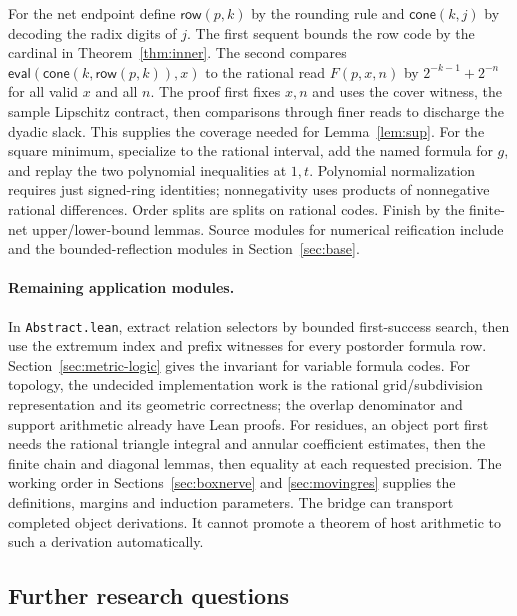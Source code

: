 For the net endpoint define $\mathsf{row}(p,k)$ by the rounding rule and $\mathsf{cone}(k,j)$ by decoding the radix digits of $j$. The first sequent bounds the row code by the cardinal in Theorem~\ref{thm:inner}. The second compares $\mathsf{eval}(\mathsf{cone}(k,\mathsf{row}(p,k)),x)$ to the rational read $F(p,x,n)$ by $2^{-k-1}+2^{-n}$ for all valid $x$ and all $n$. The proof first fixes $x,n$ and uses the cover witness, the sample Lipschitz contract, then comparisons through finer reads to discharge the dyadic slack. This supplies the coverage needed for Lemma~\ref{lem:sup}. For the square minimum, specialize to the rational interval, add the named formula for $g$, and replay the two polynomial inequalities at $1,t$. Polynomial normalization requires just signed-ring identities; nonnegativity uses products of nonnegative rational differences. Order splits are splits on rational codes. Finish by the finite-net upper/lower-bound lemmas. Source modules for numerical reification include  and the bounded-reflection modules in Section~\ref{sec:base}.

\paragraph{Remaining application modules.}
In \texttt{Abstract.lean}, extract relation selectors by bounded first-success search, then use the extremum index and prefix witnesses for every postorder formula row. Section~\ref{sec:metric-logic} gives the invariant for variable formula codes. For topology, the undecided implementation work is the rational grid/subdivision representation and its geometric correctness; the overlap denominator and support arithmetic already have Lean proofs. For residues, an object port first needs the rational triangle integral and annular coefficient estimates, then the finite chain and diagonal lemmas, then equality at each requested precision. The working order in Sections~\ref{sec:boxnerve} and \ref{sec:movingres} supplies the definitions, margins and induction parameters. The bridge  can transport completed object derivations. It cannot promote a theorem of host arithmetic to such a derivation automatically.

\subsection{Further research questions}

